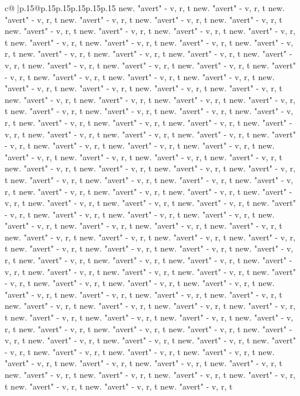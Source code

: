 \documentclass{article}
\begin{document}
{\begin{supertabular}{c@{$\;$}|p{.15\linewidth}@{}p{.15\linewidth}p{.15\linewidth}p{.15\linewidth}p{.15\linewidth}p{.15\linewidth}}
{{{new. "avert" {-} v, r, t new. "avert" {-} v, r, t new. "avert" {-} v, r, t new. "avert" {-} v, r, t new. "avert" {-} v, r, t new. "avert" {-} v, r, t new. "avert" {-} v, r, t new. "avert" {-} v, r, t new. "avert" {-} v, r, t new. "avert" {-} v, r, t new. "avert" {-} v, r, t new. "avert" {-} v, r, t new. "avert" {-} v, r, t new. "avert" {-} v, r, t new. "avert" {-} v, r, t new. "avert" {-} v, r, t new. "avert" {-} v, r, t new. "avert" {-} v, r, t new. "avert" {-} v, r, t new. "avert" {-} v, r, t new. "avert" {-} v, r, t new. "avert" {-} v, r, t new. "avert" {-} v, r, t new. "avert" {-} v, r, t new. "avert" {-} v, r, t new. "avert" {-} v, r, t new. "avert" {-} v, r, t new. "avert" {-} v, r, t new. "avert" {-} v, r, t new. "avert" {-} v, r, t new. "avert" {-} v, r, t new. "avert" {-} v, r, t new. "avert" {-} v, r, t new. "avert" {-} v, r, t new. "avert" {-} v, r, t new. "avert" {-} v, r, t new. "avert" {-} v, r, t new. "avert" {-} v, r, t new. "avert" {-} v, r, t new. "avert" {-} v, r, t new. "avert" {-} v, r, t new. "avert" {-} v, r, t new. "avert" {-} v, r, t new. "avert" {-} v, r, t new. "avert" {-} v, r, t new. "avert" {-} v, r, t new. "avert" {-} v, r, t new. "avert" {-} v, r, t new. "avert" {-} v, r, t new. "avert" {-} v, r, t new. "avert" {-} v, r, t new. "avert" {-} v, r, t new. "avert" {-} v, r, t new. "avert" {-} v, r, t new. "avert" {-} v, r, t new. "avert" {-} v, r, t new. "avert" {-} v, r, t new. "avert" {-} v, r, t new. "avert" {-} v, r, t new. "avert" {-} v, r, t new. "avert" {-} v, r, t new. "avert" {-} v, r, t new. "avert" {-} v, r, t new. "avert" {-} v, r, t new. "avert" {-} v, r, t new. "avert" {-} v, r, t new. "avert" {-} v, r, t new. "avert" {-} v, r, t new. "avert" {-} v, r, t new. "avert" {-} v, r, t new. "avert" {-} v, r, t new. "avert" {-} v, r, t new. "avert" {-} v, r, t new. "avert" {-} v, r, t new. "avert" {-} v, r, t new. "avert" {-} v, r, t new. "avert" {-} v, r, t new. "avert" {-} v, r, t new. "avert" {-} v, r, t new. "avert" {-} v, r, t new. "avert" {-} v, r, t new. "avert" {-} v, r, t new. "avert" {-} v, r, t new. "avert" {-} v, r, t new. "avert" {-} v, r, t new. "avert" {-} v, r, t new. "avert" {-} v, r, t new. "avert" {-} v, r, t new. "avert" {-} v, r, t new. "avert" {-} v, r, t new. "avert" {-} v, r, t new. "avert" {-} v, r, t new. "avert" {-} v, r, t new. "avert" {-} v, r, t new. "avert" {-} v, r, t new. "avert" {-} v, r, t new. "avert" {-} v, r, t new. "avert" {-} v, r, t new. "avert" {-} v, r, t new. "avert" {-} v, r, t new. "avert" {-} v, r, t new. "avert" {-} v, r, t new. "avert" {-} v, r, t new. "avert" {-} v, r, t new. "avert" {-} v, r, t new. "avert" {-} v, r, t new. "avert" {-} v, r, t new. "avert" {-} v, r, t new. "avert" {-} v, r, t new. "avert" {-} v, r, t new. "avert" {-} v, r, t new. "avert" {-} v, r, t new. "avert" {-} v, r, t new. "avert" {-} v, r, t new. "avert" {-} v, r, t new. "avert" {-} v, r, t new. "avert" {-} v, r, t new. "avert" {-} v, r, t new. "avert" {-} v, r, t new. "avert" {-} v, r, t new. "avert" {-} v, r, t new. "avert" {-} v, r, t new. "avert" {-} v, r, t new. "avert" {-} v, r, t new. "avert" {-} v, r, t new. "avert" {-} v, r, t new. "avert" {-} v, r, t new. "avert" {-} v, r, t }}}
\end{supertabular}}
\end{document}
